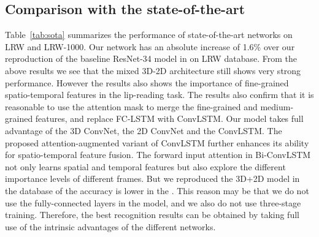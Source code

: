 \documentclass{bmvc2k}
\begin{document}
\subsection{Comparison with the state-of-the-art}
Table~\ref{tab:sota} summarizes the performance of state-of-the-art networks on LRW and LRW-1000. Our network has an absolute increase of 1.6\% over our reproduction of the baseline ResNet-34 model in \cite{1petridis2018end} on LRW database. From the above results we see that the mixed 3D-2D architecture still shows very strong performance. However the results also shows the importance of fine-grained spatio-temporal features in the lip-reading task. 
The results also confirm that it is reasonable to use the attention mask to merge the fine-grained and medium-grained features, and replace FC-LSTM with ConvLSTM. Our model takes full advantage of the 3D ConvNet, the 2D ConvNet and the ConvLSTM. The proposed attention-augmented variant of ConvLSTM further enhances its ability for spatio-temporal feature fusion. The forward input attention in Bi-ConvLSTM not only learns spatial and temporal features but also explore the different importance levels of different frames. But we reproduced the 3D+2D model in the database of the accuracy is lower in the \cite{yang2018lrw}. This reason may be that we do not use the fully-connected layers in the model, and we also do not use three-stage training. Therefore, the best recognition results can be obtained by taking full use of the intrinsic advantages of the different networks. 
\end{document}
